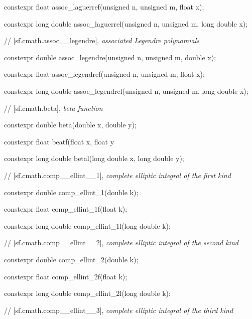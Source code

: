 \documentclass[prd,twocolumn,amsmath,amssymb,nofootinbib,eqsecnum]{revtex4-1}
\newcommand{\highlight}[1]{{\color{red} #1}}
\begin{document}
{\highlight{constexpr} float assoc\_laguerref(unsigned n, unsigned m, float x);
	
\highlight{constexpr} long double assoc\_laguerrel(unsigned n, unsigned m, long double x);

\vspace{2ex}

// [sf.cmath.assoc\_\_legendre], {\em associated Legendre polynomials}

\vspace{2ex}

\highlight{constexpr} double assoc\_legendre(unsigned n, unsigned m, double x);
	
\highlight{constexpr} float assoc\_legendref(unsigned n, unsigned m, float x);
	
\highlight{constexpr} long double assoc\_legendrel(unsigned n, unsigned m, long double x);

\vspace{2ex}

// [sf.cmath.beta], {\em beta function}

\vspace{2ex}

\highlight{constexpr} double beta(double x, double y);
	
\highlight{constexpr} float beatf(float x, float y
	
\highlight{constexpr} long double betal(long double x, long double y);

\vspace{2ex}
// [sf.cmath.comp\_\_ellint\_\_1], {\em complete elliptic integral of the first kind}
\vspace{2ex}

\highlight{constexpr} double comp\_ellint\_1(double k);
	
\highlight{constexpr} float comp\_ellint\_1f(float k);
	
\highlight{constexpr} long double comp\_ellint\_1l(long double k);

\vspace{2ex}
// [sf.cmath.comp\_\_ellint\_\_2], {\em complete elliptic integral of the second kind}
\vspace{2ex}

\highlight{constexpr} double comp\_ellint\_2(double k);
	
\highlight{constexpr} float comp\_ellint\_2f(float k);
	
\highlight{constexpr} long double comp\_ellint\_2l(long double k);

\vspace{2ex}
// [sf.cmath.comp\_\_ellint\_\_3], {\em complete elliptic integral of the third kind}
\vspace{2ex}

}
\end{document}
